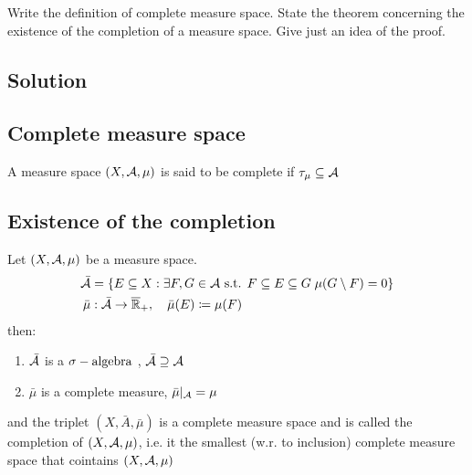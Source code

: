 
\question
Write the definition of complete measure space. State the theorem concerning the existence of the completion of a measure space. Give just an idea of the proof.

\subsection*{Solution}

\subsection{Complete measure space}
A measure space $(X,\mathcal{A},\mu)$ is said to be complete if $\tau_{\mu}\subseteq\mathcal{A}$

\subsection{Existence of the completion}
Let $(X,\mathcal{A},\mu)$ be a measure space. \provdef{$\bar{\A}, \bar{\mu}$}
\begin{align*}
    \bar{\mathcal{A}}  & =\{ E\subseteq X: \exists F,G \in \mathcal{A} \text{ s.t. } F\subseteq E \subseteq G \; \mu(G \setminus F) =0 \} \\
    \bar{\mu} & : \bar{\mathcal{A}}\to\overline{\mathbb{R}}_{+},\quad \bar{\mu}(E) \coloneqq \mu(F)
\end{align*}
then:
\begin{enumerate}
    \item $\bar{\mathcal{A}}$ is a $\sigma-\text{algebra}$ , $\bar{\mathcal{A}} \supseteq \mathcal{A}$
    \item $\bar{\mu}$ is a complete measure, $\bar{\mu}|_{\mathcal{A}}=\mu$
\end{enumerate}
and the triplet $(X,\bar{A}, \bar{\mu})$ is a complete measure space and is called the completion of $(X,\mathcal{A},\mu)$, i.e. it the smallest (w.r. to inclusion) complete measure space that cointains $(X,\mathcal{A},\mu)$
